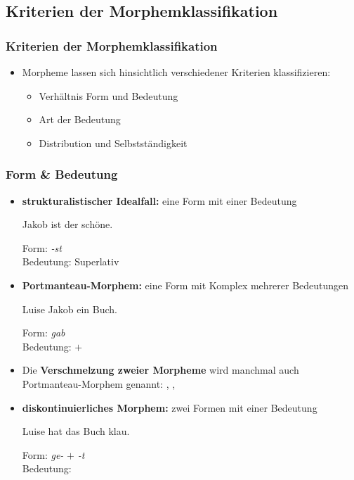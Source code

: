 \subsection{Kriterien der Morphemklassifikation}
\frame{
\frametitle{~}
	\tableofcontents[currentsection]
}


\begin{frame}
\frametitle{Kriterien der Morphemklassifikation}

\begin{itemize}
	\item Morpheme lassen sich hinsichtlich verschiedener Kriterien klassifizieren:
	
	\begin{itemize}
	 \item Verhältnis Form und Bedeutung
	 \item Art der Bedeutung
	 \item Distribution und Selbstständigkeit
	\end{itemize}
\end{itemize}


\end{frame}



\begin{frame}
\frametitle{Form \& Bedeutung}

\begin{itemize}
	\item \textbf{strukturalistischer Idealfall:} eine Form mit einer Bedeutung
	
	\ea	Jakob ist der schöne.
	
	Form: \emph{-st} \\
	Bedeutung: Superlativ
	\z

\pause 
	
	\item \textbf{Portmanteau-Morphem:}  eine Form mit Komplex mehrerer Bedeutungen
	
	\ea Luise  Jakob ein Buch.
	
	Form: \emph{gab} \\
	Bedeutung:  $+$ 
	\z
	
	\item Die \textbf{Verschmelzung zweier Morpheme} wird manchmal auch Portmanteau-Morphem genannt: , , 

\pause 
	
	\item \textbf{diskontinuierliches Morphem:} zwei Formen mit einer Bedeutung 
	
	\ea Luise hat das Buch klau.
	
	Form: \emph{ge-} $+$ \emph{-t} \\
	Bedeutung:  \\

	\z	

\end{itemize}

\end{frame}


